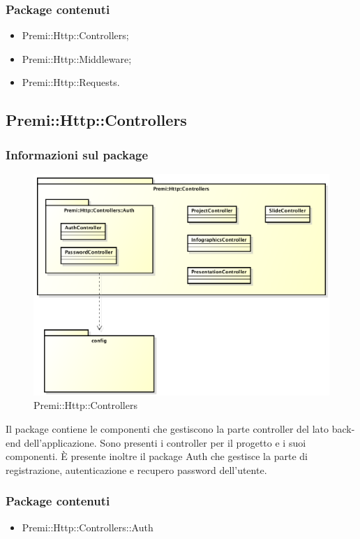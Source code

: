 	 \subsubsection*{Package contenuti}
		 \begin{itemize}
		 	\item Premi::Http::Controllers;
		 	\item Premi::Http::Middleware;
		 	\item Premi::Http::Requests.
		 \end{itemize}

\newpage
\subsection{Premi::Http::Controllers}
	\subsubsection*{Informazioni sul package}
	\begin{figure}[h]
		\centering
		\includegraphics[width=0.9\linewidth]{img/premi_http_controllers}
		\caption[Premi::Http::Controllers]{Premi::Http::Controllers}
	\end{figure}
	Il package contiene le componenti che gestiscono la parte controller del lato \gls{back-end} dell'applicazione. 
	Sono presenti i controller per il progetto e i suoi componenti. È presente inoltre il package Auth che gestisce la parte di registrazione, autenticazione e recupero password dell'utente. 

	\subsubsection*{Package contenuti}
		\begin{itemize}
			\item Premi::Http::Controllers::Auth
		\end{itemize}
